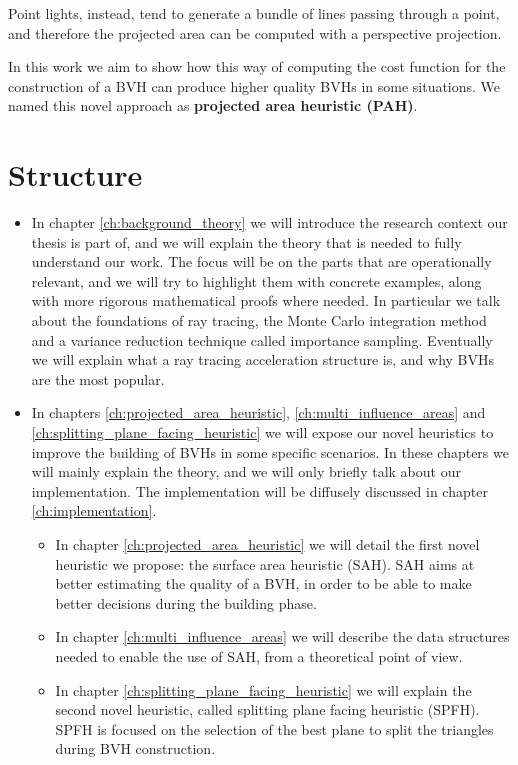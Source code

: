 \documentclass{PoliMi_MasterThesis}
\begin{document}
Point lights, instead, tend to generate a bundle of lines passing through a point, and therefore the projected area can be computed with a perspective projection.

In this work we aim to show how this way of computing the cost function for the construction of a BVH can produce higher quality BVHs in some situations. We named this novel approach as \textbf{projected area heuristic (PAH)}.
\fi
\section*{Structure}
\begin{itemize}
	\item In chapter \ref{ch:background_theory} we will introduce the research context our thesis is part of, and we will explain the theory that is needed to fully understand our work. The focus will be on the parts that are operationally relevant, and we will try to highlight them with concrete examples, along with more rigorous mathematical proofs where needed. In particular we talk about the foundations of ray tracing, the Monte Carlo integration method and a variance reduction technique called importance sampling. Eventually we will explain what a ray tracing acceleration structure is, and why BVHs are the most popular.
	\item In chapters \ref{ch:projected_area_heuristic}, \ref{ch:multi_influence_areas} and \ref{ch:splitting_plane_facing_heuristic} we will expose our novel heuristics to improve the building of BVHs in some specific scenarios. In these chapters we will mainly explain the theory, and we will only briefly talk about our implementation. The implementation will be diffusely discussed in chapter \ref{ch:implementation}.
	\begin{itemize}
		\item In chapter \ref{ch:projected_area_heuristic} we will detail the first novel heuristic we propose: the surface area heuristic (SAH). SAH aims at better estimating the quality of a BVH, in order to be able to make better decisions during the building phase.
		\item In chapter \ref{ch:multi_influence_areas} we will describe the data structures needed to enable the use of SAH, from a theoretical point of view.
		\item In chapter \ref{ch:splitting_plane_facing_heuristic} we will explain the second novel heuristic, called splitting plane facing heuristic (SPFH). SPFH is focused on the selection of the best plane to split the triangles during BVH construction.

\end{itemize}
\end{itemize}
\end{document}
